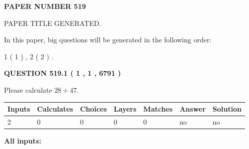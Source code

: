 \documentclass[12pt]{article}
\begin{document}
   
   
   
\newpage 
\setcounter{page}{ 
   519001 } 
   
   
   
   
 {\textbf{ \Large{ PAPER NUMBER  519  }}}
   
   
\vspace{0.2in}
   
   
   
   
   
   
   
   
 \vspace{0.2in}
 
 
 
 
   
   
 PAPER TITLE GENERATED.
   
   
   
\vspace{0.2in}
   
In this paper, big questions will be generated in the following order: 
   
   
   1 ( 1 )
 ,
   2 ( 2 )
 .
  
\vspace{0.2in}
  
{\textbf{\Large{QUESTION
519.1 
 ( 1 , 1 , 6791 )
}}}
  
  
 
Please calculate $ %
28 +  %
47 $.
 
 
   
   
   
   
\noindent\begin{tabular}{|l|l|l|l|l|l|l|}
 \hline
Inputs & Calculates & Choices & Layers & Matches & Answer & Solution \\ \hline
 2  & 
 0  & 
 0
  & 
 0  & 
 0  & 
  no & 
  no 
  \\ \hline
 \end{tabular}
   
   
   
   
\noindent{}
   
   
   
   
\noindent\vspace{0.1in}\hspace{-0.08in} {\textbf{\Large{All inputs: }}}
   
   
  
\end{document}
